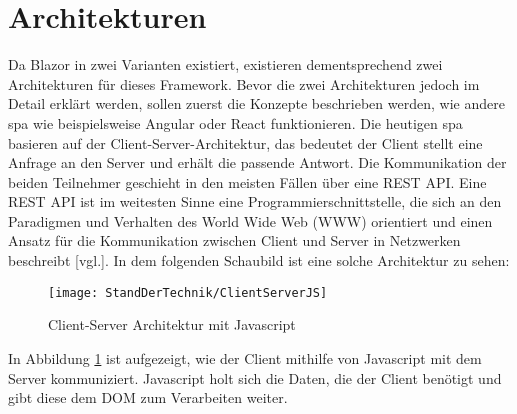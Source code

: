 \section{Architekturen}
\label{subsec:architekturen}
Da Blazor in zwei Varianten existiert, existieren dementsprechend zwei Architekturen für
dieses Framework. Bevor die zwei Architekturen jedoch im Detail erklärt werden, sollen zuerst die
Konzepte beschrieben werden, wie andere \ac{spa} wie beispielsweise Angular oder React
funktionieren. Die
heutigen \ac{spa} basieren auf der
Client-Server-Architektur, das bedeutet der Client stellt eine Anfrage an den Server und erhält die passende Antwort. Die Kommunikation der beiden Teilnehmer
geschieht in den meisten Fällen über eine REST API. Eine REST API ist im weitesten Sinne
eine Programmierschnittstelle, die sich an den Paradigmen und Verhalten des World Wide Web
(WWW) orientiert und einen Ansatz für die Kommunikation zwischen Client und Server in Netzwerken
beschreibt \cite{RESTAPI}[vgl.].
In dem folgenden Schaubild ist eine solche Architektur zu sehen:
\begin{figure}[h]
    \centering
    \texttt{[image: StandDerTechnik/ClientServerJS]}
    \caption[Client-Server Architektur mit Javascript]{Client-Server Architektur mit Javascript}
    \label{img:clientserverjs}
\end{figure}

In Abbildung \ref{img:clientserverjs} ist aufgezeigt, wie der Client mithilfe von Javascript mit
dem Server kommuniziert. Javascript holt
sich die Daten, die der Client benötigt und gibt diese dem DOM zum Verarbeiten weiter.


